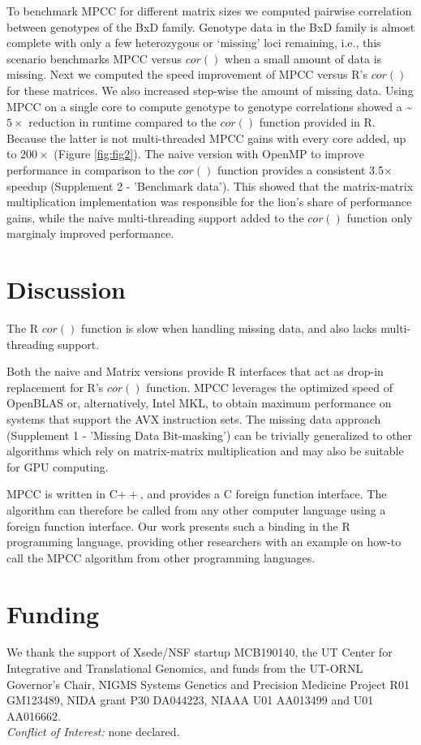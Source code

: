 \documentclass{bioinfo}
\begin{document}
To benchmark MPCC for different matrix sizes we computed pairwise
correlation between genotypes of the BxD family.  Genotype data in the
BxD family is almost complete with only a few heterozygous or
`missing' loci remaining, i.e., this scenario benchmarks MPCC versus
$cor()$ when a small amount of data is missing.  Next we computed the
speed improvement of MPCC versus R's $cor()$ for these matrices. We
also increased step-wise the amount of missing data. Using MPCC on a
single core to compute genotype to genotype correlations showed a
\textasciitilde{}$5\times$ reduction in runtime compared to the $cor()$
function provided in R. Because the latter is not multi-threaded MPCC
gains with every core added, up to $200\times$ (Figure \ref{fig:fig2}).
The naive version with OpenMP to improve performance in comparison to
the $cor()$ function provides a consistent 3.5$\times$ speedup
(Supplement 2 - 'Benchmark data'). This showed that the matrix-matrix
multiplication implementation was responsible for the lion's share of
performance gains, while the naive multi-threading support added to the
$cor()$ function only marginaly improved performance.

\vspace*{2mm}
\section{Discussion}

The R $cor()$ function is slow when handling missing data, and 
also lacks multi-threading support.

Both the naive and Matrix versions provide R interfaces that act as
drop-in replacement for R's $cor()$ function.  MPCC leverages the
optimized speed of OpenBLAS or, alternatively, Intel\textregistered{}
MKL, to obtain maximum performance on systems that support the
AVX instruction sets.  The missing data
approach (Supplement 1 - 'Missing Data Bit-masking') can be trivially
generalized to other algorithms which rely on matrix-matrix
multiplication and may also be suitable for GPU computing.

MPCC is written in C$++$, and provides a C foreign function interface. 
The algorithm can therefore be called from any other computer language 
using a foreign function interface. Our work presents such a binding 
in the R programming language, providing other researchers with 
an example on how-to call the MPCC algorithm from other programming languages.

\section*{Funding}

We thank the support of Xsede/NSF startup MCB190140, the UT Center for
Integrative and Translational Genomics, and funds from the UT-ORNL
Governor's Chair, NIGMS Systems Genetics and Precision Medicine
Project R01 GM123489, NIDA grant P30 DA044223, NIAAA U01 AA013499 and
U01 AA016662.\\
\textit{Conflict of Interest:} none declared.

\vspace*{-5mm}


\end{document}
